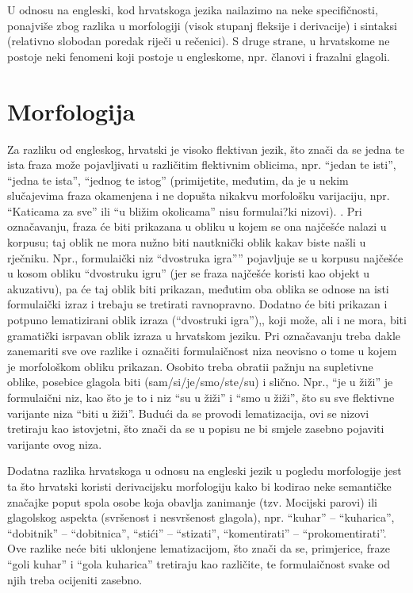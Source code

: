 \documentclass[12pt]{article}
\begin{document}
U odnosu na engleski, kod hrvatskoga jezika nailazimo na neke specifičnosti, ponajviše zbog razlika u
morfologiji (visok stupanj fleksije i derivacije) i sintaksi (relativno slobodan poredak riječi u rečenici). S
druge strane, u hrvatskome ne postoje neki fenomeni koji postoje u engleskome, npr. članovi i frazalni
glagoli.


\section*{Morfologija}

Za razliku od engleskog, hrvatski je visoko flektivan jezik, što znači da se jedna te ista fraza može
pojavljivati u različitim flektivnim oblicima, npr. ``jedan te isti'', ``jedna te ista'', ``jednog te istog'' (primijetite, međutim, da je u nekim slučajevima fraza okamenjena i ne dopušta nikakvu morfološku
varijaciju, npr.  ``Katicama za sve'' ili ``u bližim okolicama'' nisu formulai?ki nizovi). . Pri označavanju, fraza će
biti prikazana u obliku u kojem se ona najčešće nalazi u korpusu; taj oblik ne mora nužno biti nautknički
oblik kakav biste našli u rječniku. Npr., formulaički niz ``dvostruka igra'''' pojavljuje se u korpusu najčešće u
kosom obliku  ``dvostruku igru''  (jer se fraza najčešće koristi kao objekt u akuzativu), pa će taj oblik biti
prikazan, međutim oba oblika se odnose na isti formulaički izraz i trebaju se tretirati ravnopravno. Dodatno
će biti prikazan i potpuno lematizirani oblik izraza (``dvostruki igra''),, koji može, ali i ne mora, biti
gramatički isrpavan oblik izraza u hrvatskom jeziku. Pri označavanju treba dakle zanemariti sve ove razlike
i označiti formulaičnost niza neovisno o tome u kojem je morfološkom obliku prikazan. Osobito treba obratii
pažnju na supletivne oblike, posebice glagola biti (sam/si/je/smo/ste/su) i slično. Npr.,  ``je u žiži'' je
formulaični niz, kao što je to i niz ``su u žiži'' i ``smo u žiži'', što su sve flektivne varijante niza ``biti u žiži''.
Budući da se provodi lematizacija, ovi se nizovi tretiraju kao istovjetni, što znači da se u popisu ne bi smjele
zasebno pojaviti varijante ovog niza.



Dodatna razlika hrvatskoga u odnosu na engleski jezik u pogledu morfologije jest ta što hrvatski koristi
derivacijsku morfologiju kako bi kodirao neke semantičke značajke poput spola osobe koja obavlja
zanimanje (tzv. Mocijski parovi) ili glagolskog aspekta (svršenost i nesvršenost glagola), npr. ``kuhar'' –
``kuharica'', ``dobitnik'' – ``dobitnica'', ``stići'' – ``stizati'', ``komentirati'' – ``prokomentirati''.  Ove razlike neće biti
uklonjene lematizacijom, što znači da se, primjerice, fraze ``goli kuhar'' i ``gola kuharica'' tretiraju kao
različite, te formulaičnost svake od njih treba ocijeniti zasebno.
\end{document}
